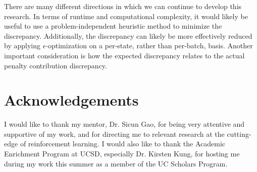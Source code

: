 \documentclass[letterpaper,twocolumn,10pt]{article}
\begin{document}
There are many different directions in which we can continue to develop this
research. In terms of runtime and computational complexity, it would likely be
useful to use a problem-independent heuristic method to minimize the
discrepancy. Additionally, the discrepancy can likely be more effectively
reduced by applying $\epsilon$-optimization on a per-state, rather than
per-batch, basis. Another important consideration is how the expected
discrepancy relates to the actual penalty contribution discrepancy.

\section{Acknowledgements}
I would like to thank my mentor, Dr. Sicun Gao, for being very attentive and
supportive of my work, and for directing me to relevant research at the
cutting-edge of reinforcement learning. I would also like to thank the Academic
Enrichment Program at UCSD, especially Dr. Kirsten Kung, for hosting me during
my work this summer as a member of the UC Scholars Program.



\end{document}
